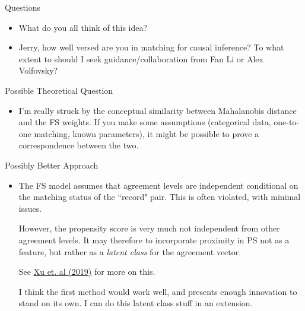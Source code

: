 \documentclass{beamer}
\begin{document}
\begin{frame}{Questions}
	\begin{itemize}
		\item What do you all think of this idea?
		\item Jerry, how well versed are you in matching for causal inference? To what extent to should I seek guidance/collaboration from Fan Li or Alex Volfovsky?
	\end{itemize}
\end{frame}

\begin{frame}{Possible Theoretical Question}
	\begin{itemize}
		\item I'm really struck by the conceptual similarity between Mahalanobis distance and the FS weights. If you make some assumptions (categorical data, one-to-one matching, known parameters), it might be possible to prove a correspondence between the two. 
	\end{itemize}
\end{frame}

\begin{frame}{Possibly Better Approach}
	\begin{itemize}
		\item The FS model assumes that agreement levels are independent conditional on the matching status of the ``record" pair. This is often violated, with minimal issues. 
		
		However, the propensity score is very much not independent from other agreement levels. It may therefore to incorporate proximity in PS not as a feature, but rather as a \emph{latent class} for the agreement vector. 
		
		See \href{https://projecteuclid.org/journals/annals-of-applied-statistics/volume-13/issue-3/Incorporating-conditional-dependence-in-latent-class-models-for-probabilistic-record/10.1214/19-AOAS1256.full}{Xu et. al (2019)} for more on this. 
		
		I think the first method would work well, and presents enough innovation to stand on its own. I can do this latent class stuff in an extension. 
	\end{itemize}
\end{frame}
\end{document}
